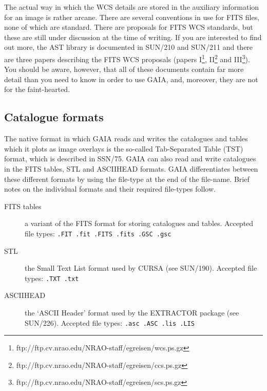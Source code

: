 \documentclass[twoside,11pt]{article}
\newcommand{\htmladdnormallinkfoot}[2]{#1\footnote{#2}}
\newcommand{\xref}[3]{#1}
\renewcommand{\_}{\texttt{\symbol{95}}}
\begin{document}
The actual way in which the WCS details are stored in the auxiliary
information for an image is rather arcane.  There are several
conventions in use for FITS files, none of which are standard.  There
are proposals for FITS WCS standards, but these are still under
discussion at the time of writing.  If you are interested to find out
more, the AST library is documented in \xref{SUN/210}{sun210}{}\cite{SUN210}
and \xref{SUN/211}{sun211}{}\cite{SUN211} and there are three papers
describing the FITS WCS proposals (papers
\htmladdnormallinkfoot{I}{ftp://ftp.cv.nrao.edu/NRAO-staff/egreisen/wcs.ps.gz},
\htmladdnormallinkfoot{II}{ftp://ftp.cv.nrao.edu/NRAO-staff/egreisen/ccs.ps.gz}
and
\htmladdnormallinkfoot{III}{ftp://ftp.cv.nrao.edu/NRAO-staff/egreisen/scs.ps.gz}).
You should be aware, however, that all of these documents contain far more
detail than you need to know in order to use GAIA, and, moreover, they
are not for the faint-hearted.

\subsection{\label{CATS}Catalogue formats}

The native format in which GAIA reads and writes the catalogues and tables
which it plots as image overlays is the so-called Tab-Separated Table (TST)
format, which is described in \xref{SSN/75}{ssn75}{}\cite{SSN75}.  GAIA
can also read and write catalogues in the FITS tables, STL and ASCII\_HEAD
formats.  GAIA differentiates between these different formats by using the
file-type at the end of the file-name.  Brief notes on the individual
formats and their required file-types follow.

\begin{description}

  \item[FITS tables] a variant of the FITS format for storing catalogues
   and tables.  Accepted file types: {\tt .FIT .fit .FITS .fits .GSC .gsc}

  \item[STL] the \xref{Small Text List format}{sun190}{STLTUT} used by
   CURSA (see \xref{SUN/190}{sun190}{}\cite{SUN190}).  Accepted file
   types: {\tt .TXT .txt}

  \item[ASCII\_HEAD] the `ASCII Header' format used by the EXTRACTOR
   package (see \xref{SUN/226}{sun226}{}\cite{SUN226}).  Accepted file
   types: {\tt .asc .ASC .lis .LIS}

\end{description}
\end{document}
